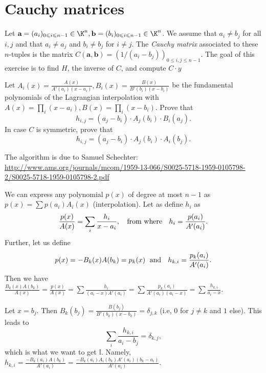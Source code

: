 \documentclass[11pt]{exam}
\theoremstyle{definition}
\begin{document}
{\section{Cauchy matrices}
Let $\textbf{a}=(a_i)_{0\leqslant i\leqslant n-1}\in\K^n, \textbf{b}=(b_i)_{0\leqslant i\leqslant n-1}\in\K^n$. We assume that $a_i\neq b_j$ for all $i,j$ and that $a_i\neq a_j$ and $b_i\neq b_j$ for $i\neq j$. The \emph{Cauchy matrix} associated to these $n$-tuples is the matrix ${C(\textbf{a},\textbf{b})=(1/(a_i-b_j))_{0\leqslant i,j\leqslant n-1}}$. The goal of this exercise is to find $H$, the inverse of $C$, and compute $C \cdot y$

\begin{questions}
	\question Let $ A_i(x) = \frac{A(x)}{A'(a_i)(x-a_i)}, B_i(x) = \frac{B(x)}{B'(b_i)(x-b_i)}$ be the fundamental polynomials of the Lagrangian interpolation with $A(x) = \prod_i (x-a_i), B(x) = \prod_i(x-b_i)$. Prove that
	\[
		h_{i,j} = (a_j-b_i)\cdot A_j(b_i)\cdot B_i(a_j).
	\]
	In case $C$ is symmetric, prove that 
	\[
	h_{i,j} = (a_j-b_i)\cdot A_j(b_i) \cdot A_i(b_j).
	\]
	\begin{solution}
		The algorithm is due to Samuel Schechter: \url{http://www.ams.org/journals/mcom/1959-13-066/S0025-5718-1959-0105798-2/S0025-5718-1959-0105798-2.pdf}
		
		We can express any polynomial $p(x)$ of degree at most $n-1$ as $p(x) = \sum p(a_i) A_i(x)$ (interpolation). Let as define $h_i$ as
		\[
			\frac{p(x)}{A(x)} = \sum_i \frac{h_i}{x-a_i}, \text{ \; from where \; }
			h_i = \frac{p(a_i)}{A'(a_i)}.
		\]
		Further, let us define
		\[
			p(x) = -B_k(x) A(b_k) = p_k(x) \text{\; and \; }
			h_{k,i} = \frac{p_k(a_i)}{A'(a_i)}.
		\]
		Then we have $\frac{B_k(x) A(b_k)}{A(x)} = \frac{p(x)}{A(x)} = \sum \frac{h_i}{(a_i -x) A'(a_i)} = \sum \frac{p_k(a_i)}{A'(a_i)(a_i - x)} = \sum \frac{h_{k,i}}{a_i -x}$.
		
		Let $x = b_j$. Then $B_k(b_j) = \frac{B(b_j)}{B'(b_k)(x-b_k)} = \delta_{j,k}$ (i.e, $0$ for $j \neq k$ and $1$ else). This leads to
		\[
			\sum_i \frac{h_{k,i}}{a_i - b_j} = \delta_{k,j},
		\]
		which is what we want to get $\mathbb{I}$. Namely, $h_{k,i} = \frac{-B_k(a_i) A(b_k)}{A'(a_i)} = \frac{-B_k(a_i)A_i(b_k) A'(a_i)(b_k - a_i)}{A'(a_i)}.$
		

\end{solution}
\end{questions}}
\end{document}
